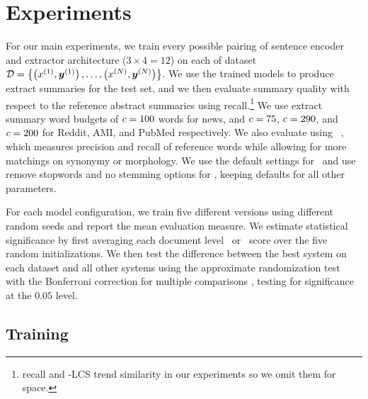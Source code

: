 
\section{Experiments} \label{sec:exps}

For our main experiments, we train every possible pairing of 
sentence encoder and extractor architecture ($3\times4=12$) on each of 
 dataset $\mathcal{D} = \left\{\left(x^{(1)}, \boldsymbol{y}^{(1)}\right),\ldots, \left(x^{(N)}, \boldsymbol{y}^{(N)}\right) \right\}$.
We use the trained models to produce extract summaries for the test 
set, and we then evaluate summary quality with respect to the reference
abstract summaries using  recall.\footnote{ recall and \rouge-LCS trend similarity in our experiments so we omit them for space.}
We use extract summary word budgets of $c=100$ words for news, and 
$c=75$, $c=290$, and $c=200$ for Reddit, AMI, and PubMed respectively.
We also evaluate using \meteor~\citep{banerjee2005meteor},
which measures precision and recall of reference words while allowing for
more matchings on synonymy or morphology.
We use the default settings for \meteor~and use remove stopwords and no stemming options for \rouge, keeping defaults for all other parameters.

For each model configuration, we train five different versions using different
random seeds and report the mean evaluation measure.
We estimate statistical significance by first averaging each document level 
\rouge~or \meteor~score over the five random initializations. 
We then test the difference between the best system on each dataset and 
all other systems using the approximate randomization test 
 with the Bonferroni correction for multiple comparisons
\citep{riezler2005pitfalls}, testing for significance at the $0.05$ level. 

\subsection{Training}

